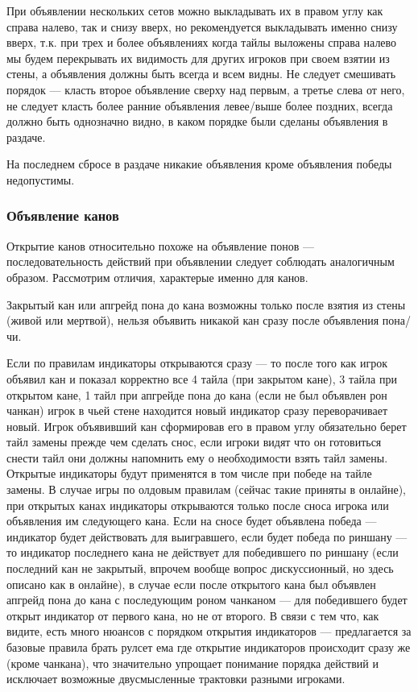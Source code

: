 При объявлении нескольких сетов можно выкладывать их в правом углу как справа налево, так и снизу вверх, но рекомендуется выкладывать именно снизу вверх, т.к. при трех и более объявлениях когда тайлы выложены справа налево мы будем перекрывать их видимость для других игроков при своем взятии из стены, а объявления должны быть всегда и всем видны. Не следует смешивать порядок --- класть второе объявление сверху над первым, а третье слева от него, не следует класть более ранние объявления левее/выше более поздних, всегда должно быть однозначно видно, в каком порядке были сделаны объявления в раздаче.

На последнем сбросе в раздаче никакие объявления кроме объявления победы недопустимы.

\subsubsection{Объявление канов}

Открытие канов относительно похоже на объявление понов --- последовательность действий при объявлении следует соблюдать аналогичным образом. Рассмотрим отличия, характерые именно для канов.

Закрытый кан или апгрейд пона до кана возможны только после взятия из стены (живой или мертвой), нельзя объявить никакой кан сразу после объявления пона/чи.


Если по правилам индикаторы открываются сразу --- то после того как игрок объявил кан и показал корректно все 4 тайла (при закрытом кане), 3 тайла при открытом кане, 1 тайл при апгрейде пона до кана (если не был объявлен рон чанкан) игрок в чьей стене находится новый индикатор сразу переворачивает новый. Игрок объявивший кан сформировав его в правом углу обязательно берет тайл замены прежде чем сделать снос, если игроки видят что он готовиться снести тайл они должны напомнить ему о необходимости взять тайл замены. Открытые индикаторы будут применятся в том числе при победе на тайле замены. В случае игры по олдовым правилам (сейчас такие приняты в онлайне), при открытых канах индикаторы открываются только после сноса игрока или объявления им следующего кана. Если на сносе будет объявлена победа --- индикатор будет действовать для выигравшего, если будет победа по риншану --- то индикатор последнего кана не действует для победившего по риншану (если последний кан не закрытый, впрочем вообще вопрос дискуссионный, но здесь описано как в онлайне), в случае если после открытого кана был объявлен апгрейд пона до кана с последующим роном чанканом --- для победившего будет открыт индикатор от первого кана, но не от второго. В связи с тем что, как видите, есть много нюансов с порядком открытия индикаторов --- предлагается за базовые правила брать рулсет ема где открытие индикаторов происходит сразу же (кроме чанкана), что значительно упрощает понимание порядка действий и исключает возможные двусмысленные трактовки разными игроками.


